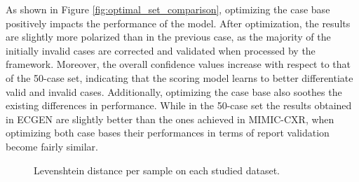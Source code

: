 As shown in Figure \ref{fig:optimal_set_comparison}, optimizing the case base positively impacts the performance of the model. After optimization, the results are slightly more polarized than in the previous case, as the majority of the initially invalid cases are corrected and validated when processed by the framework. Moreover, the overall confidence values increase with respect to that of the 50-case set, indicating that the scoring model learns to better differentiate valid and invalid cases. Additionally, optimizing the case base also soothes the existing differences in performance. While in the 50-case set the results obtained in ECGEN are slightly better than the ones achieved in MIMIC-CXR, when optimizing both case bases their performances in terms of report validation become fairly similar.

\begin{figure}[t!]
    \centering
    \caption{Levenshtein distance per sample on each studied dataset.}
    \label{fig:levenshtein_comparison}
\end{figure}


